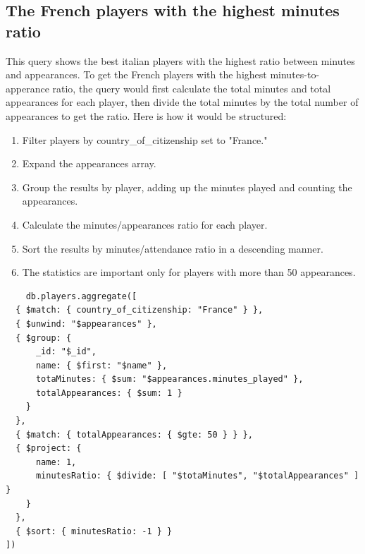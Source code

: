 \documentclass{Configuration_Files/PoliMi3i_thesis}
\begin{document}
\subsection{The French players with the highest minutes ratio}
This query shows the best italian players with the highest ratio between minutes and appearances.
To get the French players with the highest minutes-to-apperance ratio, the query would first calculate the total minutes and total appearances for each player, then divide the total minutes by the total number of appearances to get the ratio. Here is how it would be structured:
\begin{enumerate}
    \item Filter players by country\_of\_citizenship set to "France."
    \item Expand the appearances array.
    \item Group the results by player, adding up the minutes played and counting the appearances.
    \item Calculate the minutes/appearances ratio for each player.
    \item Sort the results by minutes/attendance ratio in a descending manner.
    \item The statistics are important only for players with more than 50 appearances.
\end{enumerate}
\newpage
\begin{verbatim}
    db.players.aggregate([
  { $match: { country_of_citizenship: "France" } },
  { $unwind: "$appearances" },
  { $group: { 
      _id: "$_id", 
      name: { $first: "$name" }, 
      totaMinutes: { $sum: "$appearances.minutes_played" }, 
      totalAppearances: { $sum: 1 }
    } 
  },
  { $match: { totalAppearances: { $gte: 50 } } },
  { $project: { 
      name: 1, 
      minutesRatio: { $divide: [ "$totaMinutes", "$totalAppearances" ] }
    } 
  },
  { $sort: { minutesRatio: -1 } }
])
\end{verbatim}
\end{document}
